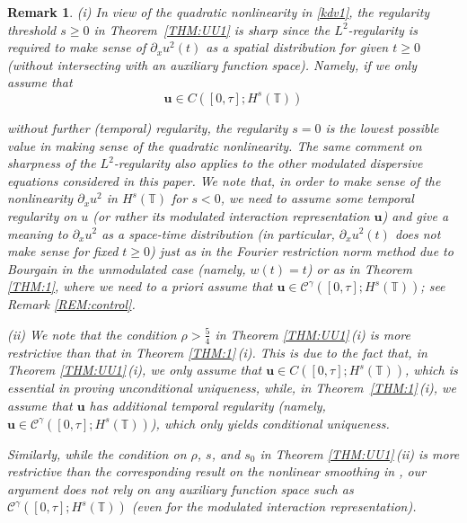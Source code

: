 \documentclass[letterpaper, 11pt,  reqno]{amsart}
\newtheorem{remark}[theorem]{Remark}
\newcommand{\1}{\hspace{0.5mm}\text{I}\hspace{0.5mm}}
\newcommand{\noi}{\noindent}
\newcommand{\T}{\mathbb{T}}
\newcommand{\CC}{\mathcal{C}}
\newcommand{\g}{\gamma}
\newcommand{\dx}{\partial_x}
\newcommand{\cC}{\mathcal{C}}
\newcommand{\uu}{\mathbf{u}}
\numberwithin{equation}{section}
\numberwithin{theorem}{section}
\begin{document}
\begin{remark}\label{REM:sharp1} \rm
(i)
In view of  the quadratic nonlinearity in \eqref{kdv1}, 
the regularity threshold $s \ge 0$ 
in Theorem~\ref{THM:UU1}
is {\it sharp} since the $L^2$-regularity is required to make
sense of $\dx u^2(t)$ as a spatial distribution for given $t \ge 0$
({\it without} intersecting with an auxiliary function space).
Namely, if we {\it only} assume that
\[ \uu \in C([0, \tau]; H^s(\T))\]

\noi
without further (temporal) regularity, 
the regularity $s = 0$ is the lowest possible value 
in making sense of the quadratic nonlinearity.
The same comment on sharpness of the $L^2$-regularity
also applies to the other modulated dispersive equations
considered in this paper.
We note that, in order to make sense of the nonlinearity $\dx u^2$
in $H^s(\T)$ for $s < 0$, we need to 
assume
some temporal regularity on $u$
(or rather its modulated interaction representation $\uu$)
and give a meaning to $\dx u^2$ as a space-time distribution
(in particular, $\dx u^2(t)$ does not make sense
for fixed $t \ge 0$)
just as in the Fourier restriction norm method due to Bourgain \cite{BO93}
in the unmodulated case (namely, $w(t) = t$)
or as in Theorem \ref{THM:1}, 
where we need to {\it a priori} assume that $\uu \in \CC^\g([0, \tau]; H^s(\T))$; 
see Remark \ref{REM:control}.


\smallskip

\noi
(ii)
We note that 
the condition $\rho > \frac 54$ in Theorem \ref{THM:UU1}\,(i)
is more restrictive than that in Theorem \ref{THM:1}\,(i).
This is due to the fact that, 
in Theorem \ref{THM:UU1}\,(i), 
we only assume  that
$\uu \in C([0, \tau]; H^s(\T))$, 
which is essential in proving unconditional uniqueness, 
while, in  Theorem~\ref{THM:1}\,(i), we assume that 
$\uu$ has additional temporal regularity
(namely, 
$\uu \in \CC^\g([0, \tau]; H^s(\T))$), 
which only yields conditional uniqueness.


Similarly, while the condition on $\rho$, $s$, and $s_0$
in Theorem \ref{THM:UU1}\,(ii) is more restrictive than
the corresponding result
on the nonlinear smoothing in \cite[Theorem 1.15]{CGLLO1}, 
our argument does not rely
on any auxiliary function space such as 
$\cC^\g([0, \tau]; H^s(\T))$
(even for the modulated interaction representation).
\end{remark}
\end{document}
